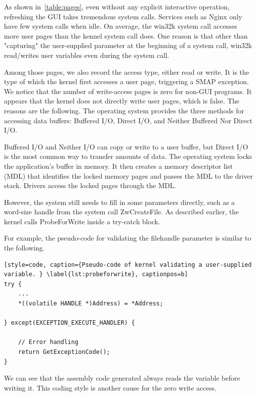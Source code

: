 As shown in~\autoref{table:pages}, even without any explicit interactive operation, refreshing the GUI takes tremendous system calls. Services such as Nginx only have few system calls when idle. On average,  the win32k system call accesses more user pages than the kennel system call does. One reason is that other than "capturing" the user-supplied parameter at the beginning of a system call, win32k read/writes user variables even during the system call. 



Among those pages, we also record the access type, either read or write. It is the type of which the kernel first accesses a user page, triggering a SMAP exception. We notice that the number of write-access pages is zero for non-GUI programs. It appears that the kernel does not directly write user pages, which is false. The reasons are the following.  The operating system provides the three methods for accessing data buffers: Buffered I/O, Direct I/O, and Neither Buffered Nor Direct I/O.

Buffered I/O and Neither I/O can copy or write to a user buffer, but Direct I/O is the most common way to transfer amounts of data. The operating system locks the application's buffer in memory. It then
creates a memory descriptor list (MDL) that identifies the locked memory pages and passes the MDL to the driver stack. Drivers access the locked pages through the MDL.

However, the system still needs to fill in some parameters directly, such as a word-size handle from the system call ZwCreateFile. As described earlier, the kernel calls ProbeForWrite inside a try-catch block.

For example, the pseudo-code for validating the filehandle parameter is similar to the following.


\begin{lstlisting}[style=code, caption={Pseudo-code of kernel validating a user-supplied variable. } \label{lst:probeforwrite}, captionpos=b]
try {
	...
	*((volatile HANDLE *)Address) = *Address;

} except(EXCEPTION_EXECUTE_HANDLER) {

	// Error handling
	return GetExceptionCode();
}
\end{lstlisting}

We can see that the assembly code generated always reads the variable before writing it. This coding style is another cause for the zero write access. 


